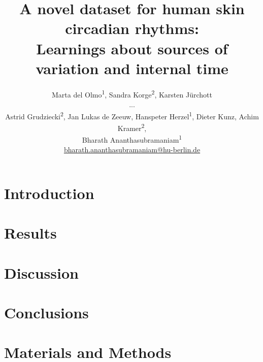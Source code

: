 \documentclass[twoside]{article} %
\title{
	A novel dataset for human skin circadian rhythms: \\[.1ex]
	Learnings about sources of variation and internal time} %
\author{%
	Marta del Olmo\textsuperscript{1}, Sandra Korge\textsuperscript{2}, Karsten J\"urchott \\[.1ex]
	...\\[.1ex]
	Astrid Grudziecki\textsuperscript{2}, Jan Lukas de Zeeuw, Hanspeter Herzel\textsuperscript{1}, Dieter Kunz, Achim Kramer\textsuperscript{2},\\[.1ex]
	Bharath Ananthasubramaniam\textsuperscript{1}\\[1ex]
\normalsize \href{mailto:bharath.ananthasubramaniam@hu-berlin.de}{bharath.ananthasubramaniam@hu-berlin.de} %
}
\date{} %
\begin{document}
\maketitle


\section{Introduction}



\section{Results}


\section{Discussion}


\section{Conclusions}

\listoftodos
\newpage
\section{Materials and Methods}

\newpage
\section*{}

\newpage
\setcounter{table}{0}
\setcounter{figure}{0}
\renewcommand{\thetable}{S\arabic{table}}%
\renewcommand{\thefigure}{S\arabic{figure}}%
\end{document}
